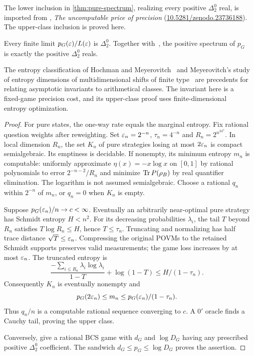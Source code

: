 The lower inclusion in \cref{thm:pure-spectrum}, realizing every positive $\Delta^0_2$ real, is imported from \cite[Theorem~1.1]{DM-U3}, \emph{The uncomputable price of precision} (\href{https://doi.org/10.5281/zenodo.23736188}{10.5281/zenodo.23736188}). The upper-class inclusion is proved here.

\begin{theorem}\label{thm:pure-spectrum}
Every finite limit $p_G(\varepsilon)/L(\varepsilon)$ is $\Delta^0_2$. Together with~\cite[Theorem~16.6 and Corollary~16.7]{DM-U3}, the positive spectrum of $p_G$ is exactly the positive $\Delta^0_2$ reals.
\end{theorem}
The entropy classification of Hochman and Meyerovitch~\cite{HM10} and Meyerovitch's study of entropy dimensions of multidimensional shifts of finite type~\cite{Mey11} are precedents for relating asymptotic invariants to arithmetical classes. The invariant here is a fixed-game precision cost, and its upper-class proof uses finite-dimensional entropy optimization.
\begin{proof}
For pure states, the one-way rate equals the marginal entropy. Fix rational question weights after reweighting. Set $\varepsilon_n=2^{-n}$, $\tau_n=4^{-n}$ and $R_n=2^{n^24^n}$. In local dimension $R_n$, the set $K_n$ of pure strategies losing at most $2\varepsilon_n$ is compact semialgebraic. Its emptiness is decidable. If nonempty, its minimum entropy $m_n$ is computable: uniformly approximate $\eta(x)=-x\log x$ on $[0,1]$ by rational polynomials to error $2^{-n-2}/R_n$ and minimize $\operatorname{Tr} P(\rho_B)$ by real quantifier elimination. The logarithm is not assumed semialgebraic. Choose a rational $q_n$ within $2^{-n}$ of $m_n$, or $q_n=0$ when $K_n$ is empty.

Suppose $p_G(\varepsilon_n)/n\to c<\infty$. Eventually an arbitrarily near-optimal pure strategy has Schmidt entropy $H<n^2$. For its decreasing probabilities $\lambda_i$, the tail $T$ beyond $R_n$ satisfies $T\log R_n\le H$, hence $T\le\tau_n$. Truncating and normalizing has half trace distance $\sqrt T\le\varepsilon_n$. Compressing the original POVMs to the retained Schmidt supports preserves valid measurements; the game loss increases by at most $\varepsilon_n$. The truncated entropy is
\[
 \frac{-\sum_{i\le R_n}\lambda_i\log\lambda_i}{1-T}+\log(1-T)
 \le H/(1-\tau_n).
\]
Consequently $K_n$ is eventually nonempty and
\[
 p_G(2\varepsilon_n)\le m_n\le p_G(\varepsilon_n)/(1-\tau_n).
\]
Thus $q_n/n$ is a computable rational sequence converging to $c$. A $0'$ oracle finds a Cauchy tail, proving the upper class.

Conversely, \cite[Theorem~16.6 and Corollary~16.7]{DM-U3} give a rational BCS game with $d_G$ and $\log D_G$ having any prescribed positive $\Delta^0_2$ coefficient. The sandwich $d_G\le p_G\le\log D_G$ proves the assertion.
\end{proof}

